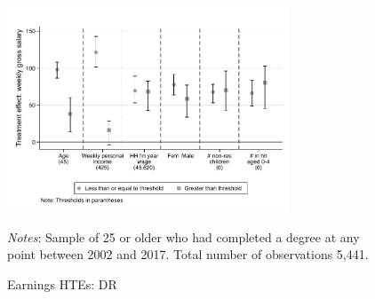 \documentclass[12pt, a4paper]{article}
\begin{document}
\begin{figure}[H]
\centering
\caption{Earnings HTEs: DR}
\vspace{0.5cm}
  \label{fig:htedr}
    \includegraphics[width=0.75\textwidth]{_figures/hte_earnings_GL_100_DR.pdf}
\parbox{1\textwidth}{\footnotesize{\textit{Notes}: Sample of 25 or older who had completed a degree at any point between 2002 and 2017. Total number of observations 5,441.}}
\end{figure}



\clearpage




\clearpage

\appendix



\titleformat{\section}[display]
  {\normalfont\Large\bfseries}{\appendixname\ \thesection}{0.2em}{}
\end{document}

